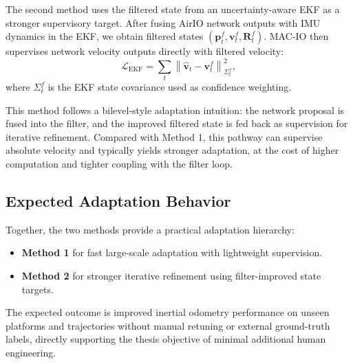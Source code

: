 The second method uses the filtered state from an uncertainty-aware EKF as a stronger supervisory target.
After fusing AirIO network outputs with IMU dynamics in the EKF, we obtain filtered states $(\mathbf{p}^{f}_t, \mathbf{v}^{f}_t, \mathbf{R}^{f}_t)$.
MAC-IO then supervises network velocity outputs directly with filtered velocity:
\begin{equation}
\label{eq:macio:ekf}
\mathcal{L}_{\text{EKF}} =
\sum_{t}
\left\|
\hat{\mathbf{v}}_{t}
-
\mathbf{v}^{f}_{t}
\right\|_{\Sigma^{f}_{t}}^{2},
\end{equation}
where $\Sigma^{f}_{t}$ is the EKF state covariance used as confidence weighting.

This method follows a bilevel-style adaptation intuition: the network proposal is fused into the filter, and the improved filtered state is fed back as supervision for iterative refinement.
Compared with Method 1, this pathway can supervise absolute velocity and typically yields stronger adaptation, at the cost of higher computation and tighter coupling with the filter loop.

\subsection{Expected Adaptation Behavior}

Together, the two methods provide a practical adaptation hierarchy:
\begin{itemize}
    \item \textbf{Method 1} for fast large-scale adaptation with lightweight supervision.
    \item \textbf{Method 2} for stronger iterative refinement using filter-improved state targets.
\end{itemize}
The expected outcome is improved inertial odometry performance on unseen platforms and trajectories without manual retuning or external ground-truth labels, directly supporting the thesis objective of minimal additional human engineering.